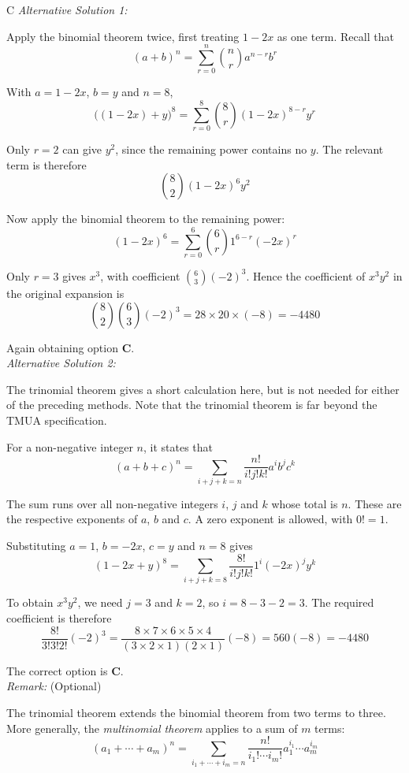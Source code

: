 \documentclass[11pt,a4paper]{article}
\begin{document}
\begin{enumerate}[label=\textbf{\arabic*.},leftmargin=*,itemsep=0pt,start=11]
\begin{djsSolution}{C}
\textit{Alternative Solution 1:}

Apply the binomial theorem twice, first treating $1-2x$ as one term. Recall that
\[
(a+b)^n=\sum_{r=0}^{n}\binom{n}{r}a^{n-r}b^r
\]

With $a=1-2x$, $b=y$ and $n=8$,
\[
\bigl((1-2x)+y\bigr)^8
=\sum_{r=0}^{8}\binom{8}{r}(1-2x)^{8-r}y^r
\]

Only $r=2$ can give $y^2$, since the remaining power contains no $y$. The relevant term is therefore
\[
\binom82(1-2x)^6y^2
\]

Now apply the binomial theorem to the remaining power:
\[
(1-2x)^6
=\sum_{r=0}^{6}\binom6r1^{6-r}(-2x)^r
\]

Only $r=3$ gives $x^3$, with coefficient $\binom63(-2)^3$. Hence the coefficient of $x^3y^2$ in the original expansion is
\[
\binom82\binom63(-2)^3
=28\times20\times(-8)
=-4480
\]

Again obtaining option \textbf{C}.\\[5pt]

\textit{Alternative Solution 2:}

The trinomial theorem gives a short calculation here, but is not needed for either of the preceding methods. Note that the trinomial theorem is far beyond the TMUA specification.

For a non-negative integer $n$, it states that
\[
(a+b+c)^n
=\sum_{i+j+k=n}\frac{n!}{i!j!k!}a^ib^jc^k
\]

The sum runs over all non-negative integers $i$, $j$ and $k$ whose total is $n$. These are the respective exponents of $a$, $b$ and $c$. A zero exponent is allowed, with $0!=1$.

Substituting $a=1$, $b=-2x$, $c=y$ and $n=8$ gives
\[
(1-2x+y)^8
=\sum_{i+j+k=8}\frac{8!}{i!j!k!}1^i(-2x)^jy^k
\]

To obtain $x^3y^2$, we need $j=3$ and $k=2$, so $i=8-3-2=3$. The required coefficient is therefore
\[
\frac{8!}{3!3!2!}(-2)^3
=\frac{8\times7\times6\times5\times4}{(3\times2\times1)(2\times1)}(-8)
=560(-8)
=-4480
\]

The correct option is \textbf{C}.\\[5pt]

\textit{Remark:} (Optional)

The trinomial theorem extends the binomial theorem from two terms to three. More generally, the \emph{multinomial theorem} applies to a sum of $m$ terms:
\[
(a_1+\cdots+a_m)^n
=\sum_{i_1+\cdots+i_m=n}
\frac{n!}{i_1!\cdots i_m!}
a_1^{i_1}\cdots a_m^{i_m}
\]


\end{djsSolution}
\end{enumerate}
\end{document}
